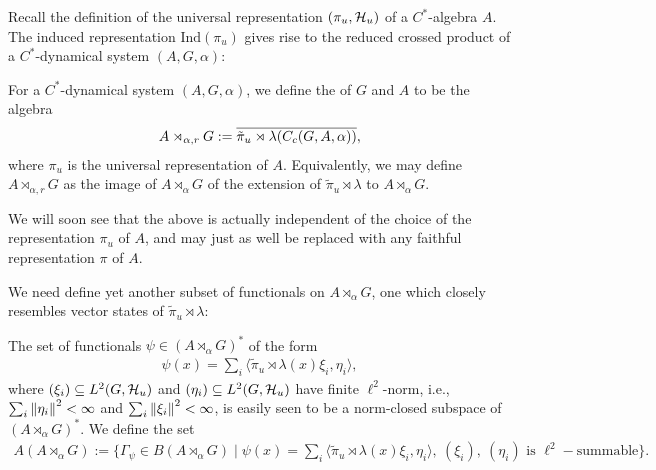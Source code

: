 Recall the definition of the universal representation $(\pi_u,\mathcal{H}_u)$ of a $C^*$-algebra $A$. The induced representation $\mathrm{Ind}(\pi_u)$ gives rise to the reduced crossed product of a $C^*$-dynamical system $(A,G,\alpha)$:
\begin{definition}
	For a $C^*$-dynamical system $(A,G,\alpha)$, we define the  of $G$ and $A$ to be the algebra
	\begin{align*}
		A \rtimes_{\alpha,r} G := \overline{\tilde \pi_u \rtimes \lambda (C_c(G,A,\alpha))},
	\end{align*}
	where $\pi_u$ is the universal representation of $A$. Equivalently, we may define $A \rtimes_{\alpha , r} G$ as the image of $A \rtimes_\alpha G$ of the extension of $\tilde \pi_u \rtimes \lambda$ to $A \rtimes_\alpha G$. 
\end{definition}
\begin{remark}
	We will soon see that the above is actually independent of the choice of the representation $\pi_u$ of $A$, and may just as well be replaced with any faithful representation $\pi$ of $A$.
\end{remark}
We need define yet another subset of functionals on $A \rtimes_\alpha G$, one which closely resembles vector states of $\tilde \pi_u \rtimes \lambda$:
\begin{definition}
	The set of functionals $\psi \in (A \rtimes_\alpha G)^*$ of the form
	\begin{align*}
		\psi(x) = \sum_{i} \langle \tilde \pi_u \rtimes \lambda (x) \xi_i , \eta_i\rangle,
	\end{align*}
	where $(\xi_i)\subseteq L^2(G,\mathcal{H}_u)$ and $(\eta_i) \subseteq L^2(G,\mathcal{H}_u)$ have finite $\ell^2$-norm, i.e., $ \sum_i \left\lVert \eta_i\right\rVert^2 < \infty$ and $\sum_{i} \left\lVert \xi_i \right\rVert^2 < \infty$, is easily seen to be a norm-closed subspace of $(A \rtimes_\alpha G)^*$. We define the set 
	\begin{align*}
		A(A \rtimes_\alpha G) := \{\Gamma_\psi \in B(A \rtimes_\alpha G) \mid \psi(x) = \sum_{i} \langle \tilde \pi_u \rtimes \lambda(x) \xi_i , \eta_i \rangle , \ (\xi_i), \ (\eta_i) \text{ is } \ell^2-\text{summable}\}.
	\end{align*}
\end{definition}
